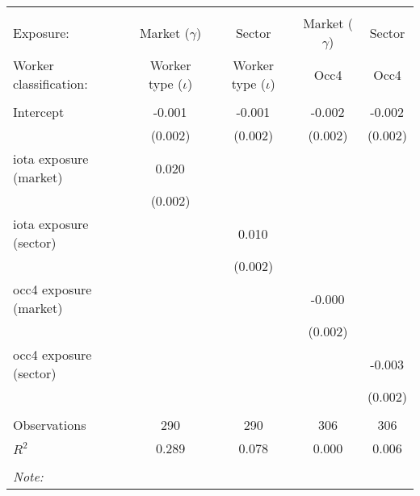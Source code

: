 \begin{tabular}{@{\extracolsep{5pt}}lcccc}
\\[-1.8ex]\hline
\hline \\[-1.8ex]
\hline \\[-1.8ex]
 Exposure: & Market ($\gamma$) & Sector & Market ($\gamma$) & Sector \\
 Worker classification: & Worker type ($\iota$) & Worker type ($\iota$) & Occ4 & Occ4 \\
 \hline &  &  &  &  \\
 Intercept & -0.001$^{}$ & -0.001$^{}$ & -0.002$^{}$ & -0.002$^{}$ \\
  & (0.002) & (0.002) & (0.002) & (0.002) \\
 iota exposure (market) & 0.020$^{}$ & & & \\
  & (0.002) & & & \\
 iota exposure (sector) & & 0.010$^{}$ & & \\
  & & (0.002) & & \\
 occ4 exposure (market) & & & -0.000$^{}$ & \\
  & & & (0.002) & \\
 occ4 exposure (sector) & & & & -0.003$^{}$ \\
  & & & & (0.002) \\
\hline \\[-1.8ex]
 Observations & 290 & 290 & 306 & 306 \\
 $R^2$ & 0.289 & 0.078 & 0.000 & 0.006 \\
\hline
\hline \\[-1.8ex]
\textit{Note:}\end{tabular}